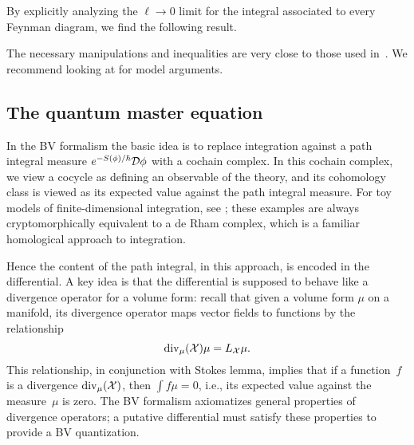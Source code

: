 \subsubsection{}

By explicitly analyzing the $\ell \to 0$ limit for the integral associated to every Feynman diagram,
we find the following result.

\begin{prop}
\end{prop}

The necessary manipulations and inequalities are very close to those used in~\cite{}.
We recommend looking at  for model arguments.



\subsection{The quantum master equation}

In the BV formalism the basic idea is to replace integration against a path integral measure $e^{-S(\phi)/\hbar} \mathcal D \phi$ with a cochain complex.
In this cochain complex, we view a cocycle as defining an observable of the theory,
and its cohomology class is viewed as its expected value against the path integral measure.
For toy models of finite-dimensional integration, see \cite{};
these examples are always cryptomorphically equivalent to a de Rham complex,
which is a familiar homological approach to integration.

Hence the content of the path integral, in this approach, is encoded in the differential. 
A key idea is that the differential is supposed to behave like a divergence operator for a volume form:
recall that given a volume form $\mu$ on a manifold, 
its divergence operator maps vector fields to functions by the relationship
\[
{\rm div}_\mu({\mathcal X}) \mu = L_{\mathcal X} \mu.
\] 
This relationship, in conjunction with Stokes lemma, 
implies that if a function~$f$ is a divergence ${\rm div}_\mu({\mathcal X})$,
then $\int f \mu = 0$,
i.e., its expected value against the measure~$\mu$ is zero.
The BV formalism axiomatizes general properties of divergence operators;
a putative differential must satisfy these properties to provide a BV quantization.

